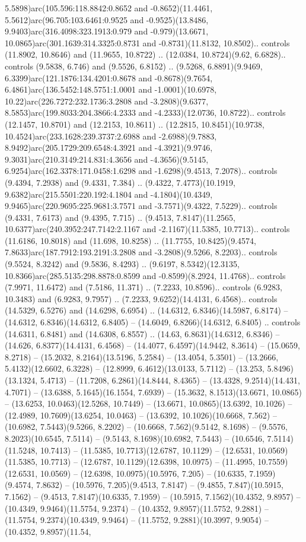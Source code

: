 5.5898)arc(105.596:118.8842:0.8652 and -0.8652)(11.4461, 5.5612)arc(96.705:103.6461:0.9525 and -0.9525)(13.8486, 9.9403)arc(316.4098:323.1913:0.979 and -0.979)(13.6671, 10.0865)arc(301.1639:314.3325:0.8731 and -0.8731)(11.8132, 10.8502).. controls (11.8902, 10.8646) and (11.9655, 10.8722) .. (12.0384, 10.8724)(9.62, 6.6828).. controls (9.5838, 6.746) and (9.5526, 6.8152) .. (9.5268, 6.8891)(9.9469, 6.3399)arc(121.1876:134.4201:0.8678 and -0.8678)(9.7654, 6.4861)arc(136.5452:148.5751:1.0001 and -1.0001)(10.6978, 10.22)arc(226.7272:232.1736:3.2808 and -3.2808)(9.6377, 8.5853)arc(199.8033:204.3866:4.2333 and -4.2333)(12.0736, 10.8722).. controls (12.1457, 10.8701) and (12.2153, 10.8611) .. (12.2815, 10.8451)(10.9738, 10.4524)arc(233.1628:239.3737:2.6988 and -2.6988)(9.7883, 8.9492)arc(205.1729:209.6548:4.3921 and -4.3921)(9.9746, 9.3031)arc(210.3149:214.831:4.3656 and -4.3656)(9.5145, 6.9254)arc(162.3378:171.0458:1.6298 and -1.6298)(9.4513, 7.2078).. controls (9.4394, 7.2938) and (9.4331, 7.384) .. (9.4322, 7.4773)(10.1919, 9.6382)arc(215.5501:220.192:4.1804 and -4.1804)(10.4349, 9.9465)arc(220.9695:225.9681:3.7571 and -3.7571)(9.4322, 7.5229).. controls (9.4331, 7.6173) and (9.4395, 7.715) .. (9.4513, 7.8147)(11.2565, 10.6377)arc(240.3952:247.7142:2.1167 and -2.1167)(11.5385, 10.7713).. controls (11.6186, 10.8018) and (11.698, 10.8258) .. (11.7755, 10.8425)(9.4574, 7.8633)arc(187.7912:193.2191:3.2808 and -3.2808)(9.5266, 8.2203).. controls (9.5524, 8.3242) and (9.5836, 8.4293) .. (9.6197, 8.5342)(12.3135, 10.8366)arc(285.5135:298.8878:0.8599 and -0.8599)(8.2924, 11.4768).. controls (7.9971, 11.6472) and (7.5186, 11.371) .. (7.2233, 10.8596).. controls (6.9283, 10.3483) and (6.9283, 9.7957) .. (7.2233, 9.6252)(14.4131, 6.4568).. controls (14.5329, 6.5276) and (14.6298, 6.6954) .. (14.6312, 6.8346)(14.5987, 6.8174) -- (14.6312, 6.8346)(14.6312, 6.8405) -- (14.6049, 6.8266)(14.6312, 6.8405) .. controls (14.6311, 6.8481) and (14.6308, 6.8557) .. (14.63, 6.8631)(14.6312, 6.8346) -- (14.626, 6.8377)(14.4131, 6.4568) -- (14.4077, 6.4597)(14.9442, 8.3614) -- (15.0659, 8.2718) -- (15.2032, 8.2164)(13.5196, 5.2584) -- (13.4054, 5.3501) -- (13.2666, 5.4132)(12.6602, 6.3228) -- (12.8999, 6.4612)(13.0133, 5.7112) -- (13.253, 5.8496)(13.1324, 5.4713) -- (11.7208, 6.2861)(14.8444, 8.4365) -- (13.4328, 9.2514)(14.431, 4.7071) -- (13.6388, 5.1645)(16.1554, 7.6939) -- (15.3632, 8.1513)(13.6671, 10.0865) -- (13.6253, 10.0463)(12.5268, 10.7449) -- (13.6671, 10.0865)(13.6392, 10.1026) -- (12.4989, 10.7609)(13.6254, 10.0463) -- (13.6392, 10.1026)(10.6668, 7.562) -- (10.6982, 7.5443)(9.5266, 8.2202) -- (10.6668, 7.562)(9.5142, 8.1698) -- (9.5576, 8.2023)(10.6545, 7.5114) -- (9.5143, 8.1698)(10.6982, 7.5443) -- (10.6546, 7.5114)(11.5248, 10.7413) -- (11.5385, 10.7713)(12.6787, 10.1129) -- (12.6531, 10.0569)(11.5385, 10.7713) -- (12.6787, 10.1129)(12.6398, 10.0975) -- (11.4995, 10.7559)(12.6531, 10.0569) -- (12.6398, 10.0975)(10.5976, 7.205) -- (10.6335, 7.1959)(9.4574, 7.8632) -- (10.5976, 7.205)(9.4513, 7.8147) -- (9.4855, 7.847)(10.5915, 7.1562) -- (9.4513, 7.8147)(10.6335, 7.1959) -- (10.5915, 7.1562)(10.4352, 9.8957) -- (10.4349, 9.9464)(11.5754, 9.2374) -- (10.4352, 9.8957)(11.5752, 9.2881) -- (11.5754, 9.2374)(10.4349, 9.9464) -- (11.5752, 9.2881)(10.3997, 9.9054) -- (10.4352, 9.8957)(11.54, 